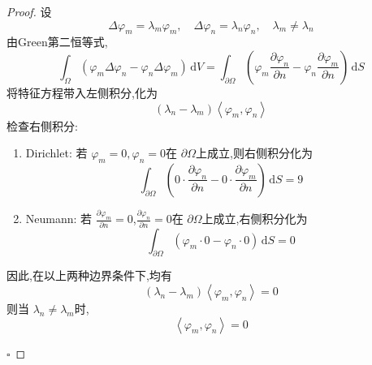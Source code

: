 \documentclass[../../main.tex]{subfiles}
\begin{document}
\begin{proof}
    设 \[
     \Delta  \varphi _{m}=  \lambda _{m} \varphi _{m},\quad  \Delta  \varphi _{n}=  \lambda _{n} \varphi _{n},\quad  \lambda _{m}\neq  \lambda _{n}
    \]由Green第二恒等式, \[
    \int_{ \Omega }\left(  \varphi _{m} \Delta  \varphi _{n}- \varphi _{n} \Delta  \varphi _{m} \right)\,\mathrm{d} V= \int_{ \partial  \Omega }\left(  \varphi _{m}\frac{\partial  \varphi _{n}}{\partial n}- \varphi _{n}\frac{\partial  \varphi _{m}}{\partial n} \right)\,\mathrm{d} S  
    \]将特征方程带入左侧积分,化为 \[
    \left(  \lambda _{n}- \lambda _{m} \right)\left< \varphi _{m}, \varphi _{n} \right> 
    \]
    检查右侧积分:\begin{enumerate}
        \item Dirichlet: 若 \(   \varphi _{m}= 0, \varphi _{n}= 0  \)在 \(   \partial  \Omega   \)上成立,则右侧积分化为 \[
        \int_{ \partial  \Omega }\left( 0\cdot \frac{\partial  \varphi _{n}}{\partial n}-0\cdot \frac{\partial  \varphi _{m}}{\partial n} \right)\,\mathrm{d} S= 9 
        \]  
        \item Neumann: 若 \(  \frac{\partial  \varphi _{m}}{\partial n}= 0  \),\(  \frac{\partial  \varphi _{n}}{\partial n}= 0  \)在 \(   \partial  \Omega   \)上成立,右侧积分化为 \[
        \int_{ \partial  \Omega }\left(  \varphi _{m}\cdot 0- \varphi _{n}\cdot 0 \right)\,\mathrm{d} S= 0 
        \]   
    \end{enumerate}
    因此,在以上两种边界条件下,均有 \[
    \left(  \lambda _{n}- \lambda _{m} \right)\left< \varphi _{m}, \varphi _{n} \right>= 0 
    \]则当 \(   \lambda _{n}\neq  \lambda _{m}  \)时, \[
    \left< \varphi _{m}, \varphi _{n} \right>= 0
    \] 

    \hfill $\square$
\end{proof}
\end{document}
